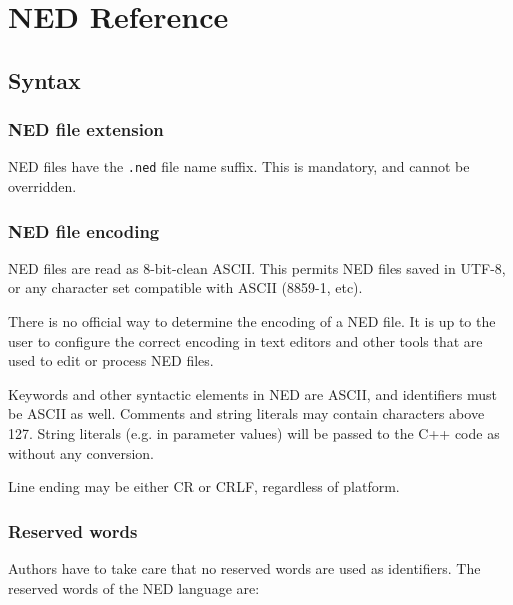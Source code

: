 \chapter{NED Reference}
\label{cha:ned-ref}

\section{Syntax}

\subsection{NED file extension}

NED files have the \texttt{.ned} file name suffix. This is mandatory, and
cannot be overridden.

\subsection{NED file encoding}

NED files are read as 8-bit-clean ASCII. This permits NED files saved
in UTF-8, or any character set compatible with ASCII (8859-1, etc).

\begin{note}
    There is no official way to determine the encoding of a NED file. It is up
    to the user to configure the correct encoding in text editors and other
    tools that are used to edit or process NED files.
\end{note}

Keywords and other syntactic elements in NED are ASCII, and identifiers must be
ASCII as well. Comments and string literals may contain characters above
127. String literals (e.g. in parameter values) will be passed to the C++ code
as  without any conversion.

Line ending may be either CR or CRLF, regardless of platform.


\subsection{Reserved words}

Authors have to take care that no reserved words are used as identifiers.
The reserved words of the NED language are:



